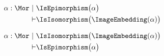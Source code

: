 

\begin{sequent}
\begin{align*}
  \alpha:\Mor~|~ & \IsEpimorphism\big( \alpha \big) \\
  \vdash &\IsIsomorphism\big( \ImageEmbedding( \alpha ) \big)
\end{align*}
\end{sequent}

\begin{sequent}
\begin{align*}
  \alpha:\Mor~|~ & \IsIsomorphism\big( \ImageEmbedding( \alpha ) \big) \\
  \vdash &\IsEpimorphism\big( \alpha \big)
\end{align*}
\end{sequent}
